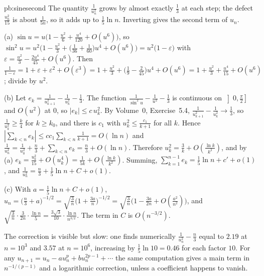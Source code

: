 \begin{solution}{pb:sinesecond}
\idea The quantity $\frac1{u_n^2}$ grows by almost exactly $\frac13$ at each step; the defect $\frac{u_n^2}{15}$ is about $\frac1{5n}$, so it adds up to $\frac15\ln n$. Inverting gives the second term
of $u_n$.

\writeup (a) $\sin u=u\bigl(1-\frac{u^2}6+\frac{u^4}{120}+O(u^6)\bigr)$, so $\sin^2u=u^2\bigl(1-\frac{u^2}3+\bigl(\frac1{36}+\frac1{60}\bigr)u^4+O(u^6)\bigr)=u^2\bigl(1-\varepsilon\bigr)$ with $\varepsilon=\frac{u^2}3-\frac{2u^4}{45}+O(u^6)$. Then
$\frac1{1-\varepsilon}=1+\varepsilon+\varepsilon^2+O(\varepsilon^3)=1+\frac{u^2}3+\bigl(\frac19-\frac2{45}\bigr)u^4+O(u^6)=1+\frac{u^2}3+\frac{u^4}{15}+O(u^6)$; divide by $u^2$.

(b) Let $e_k=\frac1{u_{k+1}^2}-\frac1{u_k^2}-\frac13$. The function $\frac1{\sin^2u}-\frac1{u^2}-\frac13$ is continuous on $\left]0,\frac\pi2\right]$ and $O(u^2)$ at $0$, so $|e_k|\le c\,u_k^2$. By Volume~0,
Exercise~5.4, $\frac1{u_{k+1}^2}-\frac1{u_k^2}\to\frac13$, so $\frac1{u_k^2}\ge\frac k4$ for $k\ge k_0$, and there is $c_1$ with $u_k^2\le\frac{c_1}{k+1}$ for all $k$. Hence $|\sum_{k<n}e_k|\le cc_1\sum_{k<n}\frac1{k+1}=O(\ln n)$ and
$\frac1{u_n^2}=\frac1{u_0^2}+\frac n3+\sum_{k<n}e_k=\frac n3+O(\ln n)$. Therefore $u_k^2=\frac3k+O(\frac{\ln k}{k^2})$, and by (a) $e_k=\frac{u_k^2}{15}+O(u_k^4)=\frac1{5k}+O(\frac{\ln k}{k^2})$. Summing,
$\sum_{k=1}^{n-1}e_k=\frac15\ln n+c'+o(1)$, and $\frac1{u_n^2}=\frac n3+\frac15\ln n+C+o(1)$.

(c) With $a=\frac15\ln n+C+o(1)$, $u_n=\bigl(\frac n3+a\bigr)^{-1/2}=\sqrt{\frac3n}\bigl(1+\frac{3a}n\bigr)^{-1/2}=\sqrt{\frac3n}\bigl(1-\frac{3a}{2n}+O(\frac{a^2}{n^2})\bigr)$, and $\sqrt{\frac3n}\cdot\frac3{2n}\cdot\frac{\ln n}5=\frac{3\sqrt3}{10}\cdot\frac{\ln n}{n^{3/2}}$.
The term in $C$ is $O(n^{-3/2})$.

\leads The correction is visible but slow: one finds numerically $\frac1{u_n^2}-\frac n3$ equal to $2.19$ at $n=10^3$ and $3.57$ at $n=10^6$, increasing by $\frac15\ln10=0.46$ for each factor $10$. For any
$u_{n+1}=u_n-au_n^p+bu_n^{2p-1}+\cdots$ the same computation gives a main term in $n^{-1/(p-1)}$ and a logarithmic correction, unless a coefficient happens to vanish.
\end{solution}

